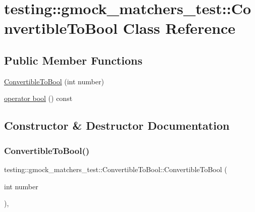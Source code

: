 \hypertarget{classtesting_1_1gmock__matchers__test_1_1_convertible_to_bool}{}\section{testing\+:\+:gmock\+\_\+matchers\+\_\+test\+:\+:Convertible\+To\+Bool Class Reference}
\label{classtesting_1_1gmock__matchers__test_1_1_convertible_to_bool}
\subsection*{Public Member Functions}
\begin{DoxyCompactItemize}
\item 
\hyperlink{classtesting_1_1gmock__matchers__test_1_1_convertible_to_bool_a4e01a99e144a393bc11a40fb43e8a6f1}{Convertible\+To\+Bool} (int number)
\item 
\hyperlink{classtesting_1_1gmock__matchers__test_1_1_convertible_to_bool_a4ad9766b9d5179a1207af2449405f071}{operator bool} () const
\end{DoxyCompactItemize}


\subsection{Constructor \& Destructor Documentation}
\mbox{\label{classtesting_1_1gmock__matchers__test_1_1_convertible_to_bool_a4e01a99e144a393bc11a40fb43e8a6f1}} 
\subsubsection{\texorpdfstring{Convertible\+To\+Bool()}{ConvertibleToBool()}}
{\footnotesize\ttfamily testing\+::gmock\+\_\+matchers\+\_\+test\+::\+Convertible\+To\+Bool\+::\+Convertible\+To\+Bool (\begin{DoxyParamCaption}\item[{int}]{number }\end{DoxyParamCaption})\hspace{0.3cm}{\ttfamily [inline]}, {\ttfamily [explicit]}}




